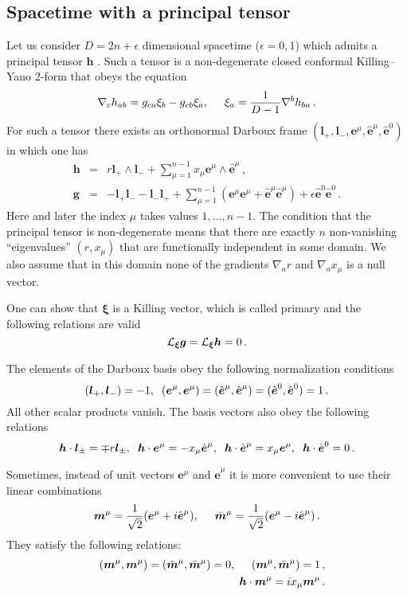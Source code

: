 \documentclass[superscriptaddress,twocolumn,showpacs,
preprintnumbers,amsmath,amssymb,nofootinbib,
longbibliography,aps,prd,10pt]{revtex4-1}
\newcommand{\hh}{,\hspace{0.5cm}}
\newcommand{\hhh}{,\hspace{0.2cm}}
\newcommand{\ts}[1]{{\boldsymbol{#1}}}         %
\newcommand{\be}{\begin{equation}}             %
\newcommand{\ee}{\end{equation}}               %
\newcommand{\ba}{\begin{eqnarray}}             %
\newcommand{\ea}{\end{eqnarray}}               %
\newcommand{\n}[1]{\label{#1}}
\begin{document}
\subsection{Spacetime with a principal tensor}
Let us consider  $D=2n+\epsilon$ dimensional spacetime ($\epsilon=0,1$) which admits a principal tensor $\ts{h}$ \cite{Frolov:2017kze}. Such a tensor is a non-degenerate closed conformal Killing--Yano 2-form that obeys the equation
\be\n{pt}
\nabla_c h_{ab}=g_{ca}\xi_b-g_{cb}\xi_a\hh \xi_a={1\over D-1}\nabla^b h_{ba}\, .
\ee
For such a tensor there exists an orthonormal Darboux frame $(\ts{l}_+,\ts{l}_-,\ts{e}^{\mu},\hat{\ts{e}}^{\mu},\hat{\ts{e}}^0)$ in which one has
\ba
\ts{h}&=&r \ts{l}_+\wedge \ts{l}_- +\sum \limits_{\mu=1}^{n-1} x_{\mu} \ts{e}^{\mu}\wedge \hat{\ts{e}}^{\mu} \, ,\\
\ts{g}&=&-\ts{l}_+ \ts{l}_- - \ts{l}_- \ts{l}_+  +\sum \limits_{\mu=1}^{n-1} (\ts{e}^{\mu}\ts{e}^{\mu}+ \hat{\ts{e}}^{\mu}\hat{\ts{e}}^{\mu})+\epsilon \hat{\ts{e}}^{0}\hat{\ts{e}}^{0}\, .\n{gg}
\ea
Here and later the index $\mu$ takes values $1,\ldots,n-1$. The condition that the principal tensor is non-degenerate means that there are exactly $n$ non-vanishing ``eigenvalues'' $(r,x_{\mu})$ that are functionally independent in some domain. We also assume that in this domain none of the gradients $\nabla_a r$ and $\nabla_a x_{\mu}$ is a null vector.

One can show that $\ts{\xi}$ is a Killing vector, which is called primary and the following relations are valid \cite{Frolov:2017kze}
\be\n{Lgh}
{\cal L}_{\ts{\xi}}\ts{g}={\cal L}_{\ts{\xi}}\ts{h}=0\, .
\ee


The elements of the Darboux basis obey the following normalization conditions
\be
(\ts{l}_+,\ts{l}_-)=-1\hhh (\ts{e}^{\mu},\ts{e}^{\mu})=(\hat{\ts{e}}^{\mu},\hat{\ts{e}}^{\mu})=(\hat{\ts{e}}^{0},\hat{\ts{e}}^{0})=1\, .
\ee
All other scalar products vanish. The basis vectors also obey the following relations
\be\n{lee}
\ts{h}\cdot \ts{l}_{\pm} =\mp r \ts{l}_{\pm} \hhh
\ts{h}\cdot \ts{e}^{\mu} =-x_{\mu} \hat{\ts{e}}^{\mu}\hhh
\ts{h}\cdot  \hat{\ts{e}}^{\mu} =x_{\mu}\ts{e}^{\mu}\hhh
\ts{h}\cdot  \hat{\ts{e}}^{0} =0
\, .
\ee

Sometimes, instead of unit vectors $\ts{e}^{\mu}$ and $\hat{\ts{e}}^{\mu}$ it is more convenient to use their linear combinations
\be
\ts{m}^{\mu}={1\over \sqrt{2}}(\ts{e}^{\mu}+i\hat{\ts{e}}^{\mu})\hh
\bar{\ts{m}}^{\mu}={1\over \sqrt{2}}(\ts{e}^{\mu}-i\hat{\ts{e}}^{\mu})\, .
\ee
They satisfy the following relations:
\ba
&& (\ts{m}^{\mu},\ts{m}^{\mu})=(\bar{\ts{m}}^{\mu},\bar{\ts{m}}^{\mu})=0\hh
(\ts{m}^{\mu},\bar{\ts{m}}^{\mu})=1\, ,\\
&&\ts{h}\cdot \ts{m}^{\mu}=ix_{\mu}\ts{m}^{\mu}\, .\n{hmx}
\ea
\end{document}
